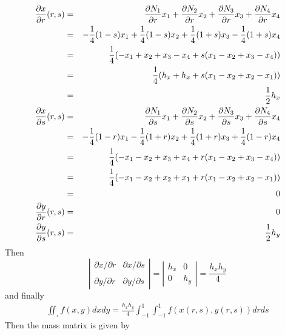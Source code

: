 \begin{eqnarray}
\frac{\partial x}{\partial r}(r,s)
&=&\frac{\partial N_1}{\partial r} x_1+\frac{\partial N_2}{\partial r} x_2
+\frac{\partial N_3}{\partial r} x_3+\frac{\partial N_4}{\partial r} x_4 \nonumber\\
&=& -\frac{1}{4}(1-s) x_1 + \frac{1}{4}(1-s) x_2 + \frac{1}{4}(1+s) x_3 - \frac{1}{4}(1+s) x_4 \nonumber\\
&=& \frac{1}{4} ( -x_1 +x_2 +x_3 -x_4  +s (x_1 -x_2 +x_3 -x_4)   )  \nonumber\\
&=& \frac{1}{4} ( h_x+h_x  +s (x_1 -x_2 +x_2 -x_1)   )  \nonumber\\
&=& \frac{1}{2} h_x \nonumber\\
\frac{\partial x}{\partial s}(r,s)
&=&\frac{\partial N_1}{\partial s} x_1+\frac{\partial N_2}{\partial s} x_2
+\frac{\partial N_3}{\partial s} x_3+\frac{\partial N_4}{\partial s} x_4 \nonumber\\
&=& -\frac{1}{4}(1-r)x_1 - \frac{1}{4}(1+r)x_2 +\frac{1}{4}(1+r)x_3 +\frac{1}{4}(1-r)x_4 \nonumber\\
&=& \frac{1}{4} ( -x_1 -x_2 +x_3+x_4 + r(x_1-x_2+x_3-x_4) ) \nonumber\\ 
&=& \frac{1}{4} ( -x_1 -x_2 +x_2+x_1 + r(x_1-x_2+x_2-x_1) ) \nonumber\\
&=& 0 \nonumber\\ 
\frac{\partial y}{\partial r}(r,s)
&=& 0 \nonumber\\
\frac{\partial y}{\partial s}(r,s)
&=& \frac{1}{2} h_y
\end{eqnarray}
Then 
\[
\left| 
\begin{array}{cc}
\partial x/\partial r & \partial x/\partial s \\ \\
\partial y/\partial r & \partial y/\partial s 
\end{array}
\right|  
=
\left| 
\begin{array}{cc}
h_x & 0 \\
0 & h_y 
\end{array}
\right|  
= \frac{h_xh_y}{4}
\]
and finally  
\begin{eqnarray}
\boxed{
\iint_\square f(x,y) dx dy =  \frac{h_xh_y}{4} \int_{-1}^{1} \int_{-1}^{1} f(x(r,s),y(r,s)) dr ds
}
\end{eqnarray}
Then the mass matrix is given by
